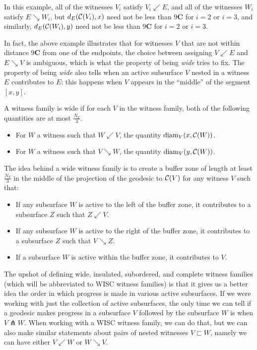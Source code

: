 \documentclass[12pt, reqno]{amsart}
\begin{document}
  In this example, all of the witnesses $V_i$ satisfy $V_i \swarrow E$, and all of the witnesses $W_i$ satisfy $E \searrow W_i$, but $d_E(\mathcal{C}(V_i), x)$ need not be less than $9\mathbf{C}$ for $i=2$ or $i=3$, and similarly, $d_E(\mathcal{C}(W_i), y)$ need not be less than $9 \mathbf{C}$ for $i=2$ or $i=3$.

  In fact, the above example illustrates that for witnesses $V$ that are not within distance $9 \mathbf{C}$ from one of the endpoints, the choice between assigning $V \swarrow E$ and $E \searrow V$ is ambiguous, which is what the property of being \emph{wide} tries to fix.
  The property of being \emph{wide} also tells when an active subsurface $V$ nested in a witness $E$ contributes to $E$: this happens when $V$ appears in the ``middle'' of the segment $[x,y]$.


  \begin{definition}
    A witness family is wide if for each $V$ in the witness family, both of the following quantities are at most $\frac{N_V}{3}$.
    \begin{itemize}
    \item For $W$ a witness such that $W \swarrow V$, the quantity $\mathrm{diam}_V(x, \mathcal{C}(W))$.
    \item For $W$ a witness such that $V \searrow W$, the quantity $\mathrm{diam}_V(y, \mathcal{C}(W))$.
    \end{itemize}
  \end{definition}

  The idea behind a wide witness family is to create a buffer zone of length at least $\frac{N_V}{3}$ in the middle of the projection of the geodesic to $\mathcal{C}(V)$ for any witness $V$ such that:
  \begin{itemize}
  \item If any subsurface $W$ is active to the left of the buffer zone, it contributes to a subsurface $Z$ such that $Z \swarrow V$.
  \item If any subsurface $W$ is active to the right of the buffer zone, it contributes to a subsurface $Z$ such that $V \searrow Z$.
  \item If a subsurface $W$ is active within the buffer zone, it contributes to $V$.
  \end{itemize}

  The upshot of defining wide, insulated, subordered, and complete witness families (which will be abbreviated to WISC witness families) is that it gives us a better idea the order in which progress is made in various active subsurfaces.
  If we were working with just the collection of active subsurfaces, the only time we can tell if a geodesic makes progress in a subsurface $V$ followed by the subsurface $W$ is when $V \pitchfork W$.
  When working with a WISC witness family, we can do that, but we can also make similar statements about pairs of nested witnesses $V \sqsubset W$, namely we can have either $V \swarrow W$ or $W \searrow V$.
\end{document}
